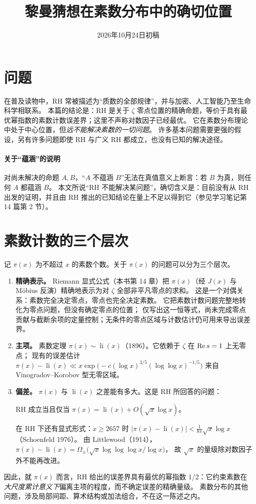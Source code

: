 \documentclass[11pt]{article}
\date{2026年10月24日初稿}
\title{黎曼猜想在素数分布中的确切位置}
\newcommand{\li}{\operatorname{li}}
\begin{document}
\maketitle

\par\medskip

\section{问题}
在普及读物中，RH 常被描述为“质数的全部规律”，并与加密、人工智能乃至生命科学相联系。
本篇的结论是：RH 是关于 $\zeta$ 零点位置的精确命题，等价于具有最优幂指数的素数计数误差界；这里不声称对数因子已经最优。
它在素数分布理论中处于中心位置，但\emph{远不能解决素数的一切问题}。
许多基本问题需要更强的假设，另有许多问题即使 RH 与广义 RH 都成立，也没有已知的解决途径。

\paragraph{关于“蕴涵”的说明}
对尚未解决的命题 $A,B$，“$A$ 不蕴涵 $B$”无法在真值意义上断言：若 $B$ 为真，则任何 $A$ 都蕴涵 $B$。
本文所说“RH 不能解决某问题”，确切含义是：目前没有从 RH 出发的证明，并且由 RH 推出的已知结论在量上不足以得到它（参见学习笔记第 14 篇第 2 节）。

\section{素数计数的三个层次}
记 $\pi(x)$ 为不超过 $x$ 的素数个数。关于 $\pi(x)$ 的问题可以分为三个层次。
\begin{enumerate}
 \item \textbf{精确表示。} Riemann 显式公式（本书第 14 章）把 $\pi(x)$（经 $J(x)$ 与 Möbius 反演）精确地表示为对 $\zeta$ 全部非平凡零点的求和。
 这是一个对偶关系：素数完全决定零点，零点也完全决定素数。
 它把素数计数问题完整地转化为零点问题，但没有确定零点的位置；
 仅写出这一恒等式，尚未完成零点贡献与截断余项的定量控制；无条件的零点区域与计数估计仍可用来导出误差界。
 \item \textbf{主项。} 素数定理 $\pi(x)\sim\li(x)$（1896）。它依赖于 $\zeta$ 在 $\operatorname{Re} s=1$ 上无零点；
 现有的误差估计 $\pi(x)-\li(x)\ll x\exp\bigl(-c(\log x)^{3/5}(\log\log x)^{-1/5}\bigr)$ 来自 Vinogradov--Korobov 型无零区域。
 \item \textbf{偏差。} $\pi(x)$ 与 $\li(x)$ 之差能有多大。这是 RH 所回答的问题：
 \begin{theorem}
 RH 成立当且仅当 $\pi(x)=\li(x)+O(\sqrt x\log x)$。
 \end{theorem}
 在 RH 下还有显式形式：$x\ge2657$ 时 $|\pi(x)-\li(x)|<\frac1{8\pi}\sqrt x\log x$（Schoenfeld 1976）。
 由 Littlewood（1914），$\pi(x)-\li(x)=\Omega_\pm\bigl(\sqrt x\log\log\log x/\log x\bigr)$，
 故 $\sqrt x$ 的量级除对数因子外不能再改进。
\end{enumerate}
因此，就 $\pi(x)$ 而言，RH 给出的误差界具有最优的幂指数 $1/2$：它约束素数在\emph{大尺度累计意义下}偏离主项的程度，而不确定误差的精确量级。
素数分布的其他问题，涉及局部间距、算术结构或加法组合，不在这一陈述之内。
\end{document}
